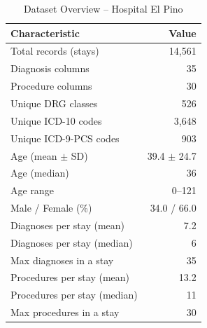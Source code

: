 \begin{table}[t]
\centering
\caption{Dataset Overview -- Hospital El Pino}
\label{tab:dataset_overview}
\begin{tabular}{lr}
\toprule
\textbf{Characteristic} & \textbf{Value} \\
\midrule
Total records (stays) & 14,561 \\
Diagnosis columns & 35 \\
Procedure columns & 30 \\
Unique DRG classes & 526 \\
Unique ICD-10 codes & 3,648 \\
Unique ICD-9-PCS codes & 903 \\
\midrule
Age (mean $\pm$ SD) & 39.4 $\pm$ 24.7 \\
Age (median) & 36 \\
Age range & 0--121 \\
Male / Female (\%) & 34.0 / 66.0 \\
\midrule
Diagnoses per stay (mean) & 7.2 \\
Diagnoses per stay (median) & 6 \\
Max diagnoses in a stay & 35 \\
Procedures per stay (mean) & 13.2 \\
Procedures per stay (median) & 11 \\
Max procedures in a stay & 30 \\
\bottomrule
\end{tabular}
\end{table}